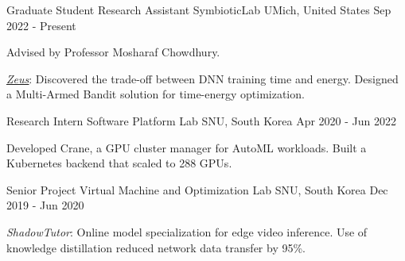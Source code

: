 

\begin{cventries}

  \cventry
    {Graduate Student Research Assistant} %
    {SymbioticLab} %
    {UMich, United States} %
    {Sep 2022 - Present} %
    {
      \begin{cvitems} %
        \item {Advised by Professor Mosharaf Chowdhury.}
        \item {\href{https://ml.energy/zeus}{\underline{\textit{Zeus}}}: Discovered the trade-off between DNN training time and energy. Designed a Multi-Armed Bandit solution for time-energy optimization.}
      \end{cvitems}
    }
    
  \cventry
    {Research Intern} %
    {Software Platform Lab} %
    {SNU, South Korea} %
    {Apr 2020 - Jun 2022} %
    {
      \begin{cvitems} %
        \item {Developed Crane, a GPU cluster manager for AutoML workloads. Built a Kubernetes backend that scaled to 288 GPUs.}
      \end{cvitems}
    }
    
  \cventry
    {Senior Project} %
    {Virtual Machine and Optimization Lab} %
    {SNU, South Korea} %
    {Dec 2019 - Jun 2020} %
    {
      \begin{cvitems} %
        \item {\textit{ShadowTutor}: Online model specialization for edge video inference. Use of knowledge distillation reduced network data transfer by 95\%.}
      \end{cvitems}
    }
    

\end{cventries}
